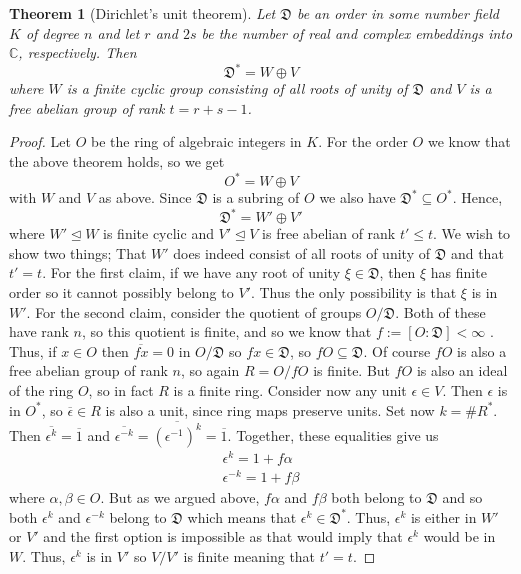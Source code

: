 \documentclass{article}
\newtheorem{theorem}{Theorem}[section]
\newcommand{\mfrak}[1]{\mathfrak{#1}}
\newcommand{\mbb}[1]{\mathbb{#1}}
\begin{document}
\begin{theorem}[Dirichlet's unit theorem]
    Let $\mfrak D$ be an order in some number field $K$ of degree $n$ and let $r$ and $2s$ be the number of real and complex embeddings into $\mbb C$, respectively. Then $$\mfrak D^* = W \oplus V$$
    where $W$ is a finite cyclic group consisting of all roots of unity of $\mfrak D$ and $V$ is a free abelian group of rank $t = r + s - 1$.
\end{theorem}
\begin{proof}
    Let $O$ be the ring of algebraic integers in $K$. For the order $O$ we know that the above theorem holds, so we get
    $$O^* = W \oplus V$$
    with $W$ and $V$ as above. Since $\mfrak D$ is a subring of $O$ we also have $\mfrak D^* \subseteq O^*$. Hence, $$\mfrak D^* = W' \oplus V'$$ 
    where $W' \trianglelefteq W$ is finite cyclic and $V' \trianglelefteq V$ is free abelian of rank $t' \leq t$. We wish to show two things; That $W'$ does indeed consist of all roots of unity of $\mfrak D$ and that $t' = t$. For the first claim, if we have any root of unity $\xi \in \mfrak{D}$, then $\xi$ has finite order so it cannot possibly belong to $V'$. Thus the only possibility is that $\xi$ is in $W'$. For the second claim, consider the quotient of groups $O / \mfrak D$. Both of these have rank $n$, so this quotient is finite, and so we know that $f := [O : \mfrak D] < \infty$ . Thus, if $x \in O$ then $\overline {fx} = 0$ in $O / \mfrak D$ so $fx \in \mfrak D$, so $f O \subseteq \mfrak D$. Of course $f O$ is also a free abelian group of rank $n$, so again $R = O / f O$ is finite. But $fO$ is also an ideal of the ring $O$, so in fact $R$ is a finite ring. Consider now any unit $\epsilon \in V$. Then $\epsilon$ is in $O^*$, so $\overline \epsilon \in R$ is also a unit, since ring maps preserve units. Set now $k = \# R^*$. Then $\overline {\epsilon^k} = \overline 1$ and $\overline {\epsilon^{-k}} = \overline {(\epsilon^{-1})^k} = \overline 1$. Together, these equalities give us
    \begin{align*}
        \epsilon^k = 1 + f \alpha \\
        \epsilon^{-k} = 1 + f \beta
    \end{align*}
    where $\alpha, \beta \in O$. But as we argued above, $f \alpha$ and $f \beta$ both belong to $\mfrak D$ and so both $\epsilon^k$ and $\epsilon^{-k}$ belong to $\mfrak D$ which means that  $\epsilon^k \in \mfrak D^*$. Thus, $\epsilon^k$ is either in $W'$ or $V'$ and the first option is impossible as that would imply that $\epsilon^k$ would be in $W$. Thus, $\epsilon^k$ is in $V'$ so $V / V'$ is finite meaning that $t' = t$.
\end{proof}
\end{document}
